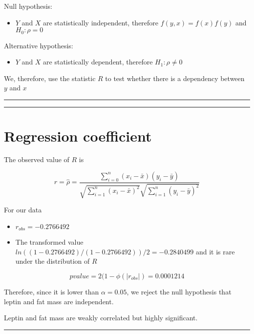 \documentclass[
]{book}
\providecommand{\tightlist}{%
  \setlength{\itemsep}{0pt}\setlength{\parskip}{0pt}}
\begin{document}
Null hypothesis:

\begin{itemize}
\tightlist
\item
  \(Y\) and \(X\) are statistically independent, therefore \(f(y,x)=f(x)f(y)\) and \(H_0: \rho=0\)
\end{itemize}

Alternative hypothesis:

\begin{itemize}
\tightlist
\item
  \(Y\) and \(X\) are statistically dependent, therefore \(H_1: \rho \neq 0\)
\end{itemize}

We, therefore, use the statistic \(R\) to test whether there is a dependency between \(y\) and \(x\)

\begin{center}\rule{0.5\linewidth}{0.5pt}\end{center}

\begin{center}\rule{0.5\linewidth}{0.5pt}\end{center}

\hypertarget{regression-coefficient}{%
\section{Regression coefficient}\label{regression-coefficient}}

The observed value of \(R\) is

\[r=\hat{\rho}=\frac{\sum_{i=0}^n(x_i-\bar{x})(y_i-\bar{y})}{\sqrt{\sum_{i=1}^n(x_i-\bar{x})^2}\sqrt{\sum_{i=1}^n(y_i-\bar{y})^2}}\]

For our data

\begin{itemize}
\item
  \(r_{obs}=-0.2766492\)
\item
  The transformed value \(ln((1-0.2766492)/(1-0.2766492))/2=-0.2840499\) and it is rare under the distribution of \(R\)
\end{itemize}

\[pvalue=2(1- \phi(|r_{obs}|)=0.0001214\]

Therefore, since it is lower than \(\alpha=0.05\), we reject the null hypothesis that leptin and fat mass are independent.

Leptin and fat mass are weakly correlated but highly significant.

\begin{center}\rule{0.5\linewidth}{0.5pt}\end{center}
\end{document}
